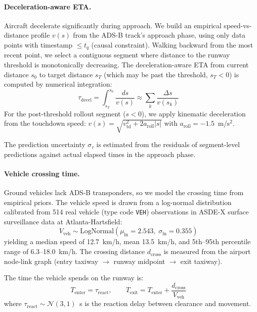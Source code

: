 \documentclass[11pt,a4paper]{article}
\begin{document}
\paragraph{Deceleration-aware ETA.}
Aircraft decelerate significantly during approach.
We build an empirical speed-vs-distance profile $v(s)$ from the ADS-B track's approach phase, using only data points with timestamp $\leq t_q$ (causal constraint).
Walking backward from the most recent point, we select a contiguous segment where distance to the runway threshold is monotonically decreasing.
The deceleration-aware ETA from current distance $s_0$ to target distance $s_T$ (which may be past the threshold, $s_T < 0$) is computed by numerical integration:
\begin{equation}
    \tau_{\mathrm{decel}} = \int_{s_T}^{s_0} \frac{ds}{v(s)}
    \approx \sum_{k} \frac{\Delta s}{v(s_k)}
    \label{eq:decel_eta}
\end{equation}
For the post-threshold rollout segment ($s < 0$), we apply kinematic deceleration from the touchdown speed: $v(s) = \sqrt{v_{\mathrm{td}}^2 + 2 a_{\mathrm{roll}} |s|}$ with $a_{\mathrm{roll}} = -1.5$~m/s$^2$.

The prediction uncertainty $\sigma_{\tau}$ is estimated from the residuals of segment-level predictions against actual elapsed times in the approach phase.

\paragraph{Vehicle crossing time.}
Ground vehicles lack ADS-B transponders, so we model the crossing time from empirical priors.
The vehicle speed is drawn from a log-normal distribution calibrated from 514 real vehicle (type code \texttt{VEH}) observations in ASDE-X surface surveillance data at Atlanta-Hartsfield:
\begin{equation}
    V_{\mathrm{veh}} \sim \mathrm{LogNormal}(\mu_{\ln} = 2.543,\; \sigma_{\ln} = 0.355)
    \label{eq:lognormal}
\end{equation}
yielding a median speed of 12.7~km/h, mean 13.5~km/h, and 5th--95th percentile range of 6.3--18.0~km/h.
The crossing distance $d_{\mathrm{cross}}$ is measured from the airport node-link graph (entry taxiway $\to$ runway midpoint $\to$ exit taxiway).

The time the vehicle spends on the runway is:
\begin{equation}
    T_{\mathrm{enter}} = \tau_{\mathrm{react}}, \qquad
    T_{\mathrm{exit}} = T_{\mathrm{enter}} + \frac{d_{\mathrm{cross}}}{V_{\mathrm{veh}}}
    \label{eq:vehicle_timing}
\end{equation}
where $\tau_{\mathrm{react}} \sim \mathcal{N}(3, 1)$~s is the reaction delay between clearance and movement.
\end{document}
